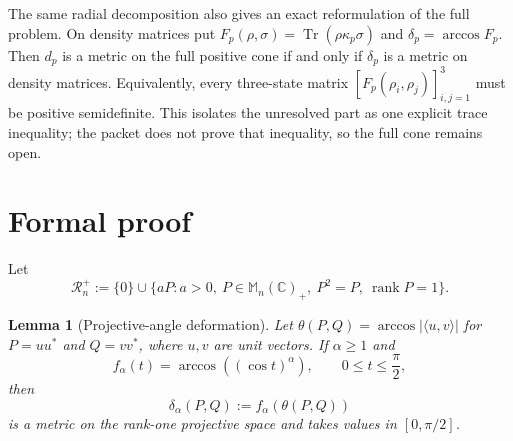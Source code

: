 \documentclass[11pt]{article}
\newtheorem{lemma}{Lemma}
\newcommand{\M}{\mathbb M}
\newcommand{\C}{\mathbb C}
\newcommand{\Tr}{\operatorname{Tr}}
\newcommand{\rank}{\operatorname{rank}}
\begin{document}
The same radial decomposition also gives an exact reformulation of the full
problem.  On density matrices put
$F_p(\rho,\sigma)=\Tr(\rho\mathbin{\kappa_p}\sigma)$ and
$\delta_p=\arccos F_p$.  Then $d_p$ is a metric on the full positive cone if
and only if $\delta_p$ is a metric on density matrices.  Equivalently, every
three-state matrix $[F_p(\rho_i,\rho_j)]_{i,j=1}^3$ must be positive
semidefinite.  This isolates the unresolved part as one explicit trace
inequality; the packet does not prove that inequality, so the full cone remains
open.

\section*{Formal proof}

Let
\[
 \mathcal R_n^+
   :=\{0\}\cup\{aP:a>0,\ P\in\M_n(\C)_+,\ P^2=P,\ \rank P=1\}.
\]

\begin{lemma}[Projective-angle deformation]\label{lem:deformation}
Let $\theta(P,Q)=\arccos|\langle u,v\rangle|$ for $P=uu^*$ and $Q=vv^*$,
where $u,v$ are unit vectors.  If $\alpha\geq1$ and
\[
 f_\alpha(t)=\arccos((\cos t)^\alpha),\qquad 0\leq t\leq\frac\pi2,
\]
then
\[
 \delta_\alpha(P,Q):=f_\alpha(\theta(P,Q))
\]
is a metric on the rank-one projective space and takes values in
$[0,\pi/2]$.
\end{lemma}
\end{document}
